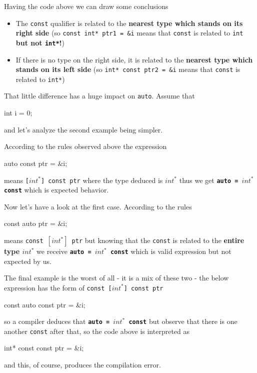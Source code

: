 \documentclass[../main]{subfiles}
\begin{document}
    Having the code above we can draw some conclusions
\begin{itemize}
    \item The \texttt{const} qualifier is related to the \textbf{nearest type which stands on its right side} (so \texttt{const int* ptr1 = \&i}
    means that \texttt{const} is related to \texttt{int} \textbf{but not \texttt{int*}!})
    \item If there is no type on the right side, it is related to the \textbf{nearest type which stands on its left side}
    (so \texttt{int* const ptr2 = \&i} means that \texttt{const} is related to \texttt{int*})
\end{itemize}

    That little difference has a huge impact on \texttt{auto}.
Assume that
\begin{Code}
    int i = 0;
\end{Code}
and let's analyze the second example being simpler.\newline

    According to the rules observed above the expression
\begin{Code}
    auto const ptr = &i;
\end{Code}
means \texttt{[$int^{*}$] const ptr} where the type deduced
is \texttt{$int^{*}$} thus we get\linebreak
\textbf{\texttt{auto = $int^{*}$ const}} which is expected behavior.\newline

    Now let's have a look at the first case. According to the rules
\begin{Code}
    const auto ptr = &i;
\end{Code}
means \texttt{const $[int^{*}]$ ptr} but knowing that the \texttt{const}
is related to the \textbf{entire type \texttt{$int^{*}$}} we receive
\textbf{\texttt{auto = $int^{*}$ const}} which is valid expression but
not expected by us.\newline

    The final example is the worst of all - it is a mix of these two -
the below expression has the form of \texttt{const [$int^{*}$] const ptr}
\begin{Code}
    const auto const ptr = &i;
\end{Code}
so a compiler deduces that \textbf{\texttt{auto = $int^{*}$ const}} but
observe that there is one another \texttt{const} after that, so
the code above is interpreted as
\begin{Code}
    int* const const ptr = &i;
\end{Code}
and this, of course, produces the compilation error.\newline
\end{document}
